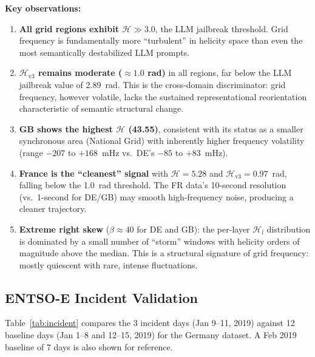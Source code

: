 \documentclass[11pt,a4paper]{article}
\begin{document}
\textbf{Key observations:}

\begin{enumerate}[label=(\arabic*)]
    \item \textbf{All grid regions exhibit $\mathcal{H} \gg 3.0$}, the LLM jailbreak threshold. Grid frequency is fundamentally more ``turbulent'' in helicity space than even the most semantically destabilized LLM prompts.
    \item \textbf{$\mathcal{H}_{\text{v3}}$ remains moderate ($\approx 1.0$ rad)} in all regions, far below the LLM jailbreak value of 2.89~rad. This is the cross-domain discriminator: grid frequency, however volatile, lacks the sustained representational reorientation characteristic of semantic structural change.
    \item \textbf{GB shows the highest $\mathcal{H}$ (43.55)}, consistent with its status as a smaller synchronous area (National Grid) with inherently higher frequency volatility (range $-207$ to $+168$~mHz vs.\ DE's $-85$ to $+83$~mHz).
    \item \textbf{France is the ``cleanest'' signal} with $\mathcal{H}=5.28$ and $\mathcal{H}_{\text{v3}}=0.97$~rad, falling below the 1.0~rad threshold. The FR data's 10-second resolution (vs.\ 1-second for DE/GB) may smooth high-frequency noise, producing a cleaner trajectory.
    \item \textbf{Extreme right skew} ($\beta \approx 40$ for DE and GB): the per-layer $\mathcal{H}_l$ distribution is dominated by a small number of ``storm'' windows with helicity orders of magnitude above the median. This is a structural signature of grid frequency: mostly quiescent with rare, intense fluctuations.
\end{enumerate}

\subsection{ENTSO-E Incident Validation}

Table~\ref{tab:incident} compares the 3 incident days (Jan 9--11, 2019) against 12 baseline days (Jan 1--8 and 12--15, 2019) for the Germany dataset. A Feb 2019 baseline of 7 days is also shown for reference.
\end{document}

